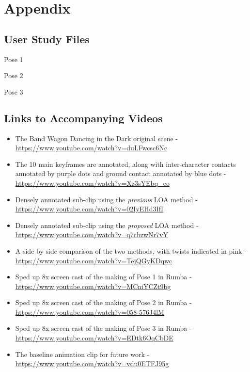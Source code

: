 \appendix \chapter{Appendix}\label{chap:appendix}
\section{User Study Files}
Pose 1

Pose 2

Pose 3

\section{Links to Accompanying Videos}

\begin{itemize}
\item The Band Wagon Dancing in the Dark original scene - \url{https://www.youtube.com/watch?v=duLFwcsc6Nc}

\item The 10 main keyframes are annotated, along with inter-character contacts annotated by purple dots and ground contact annotated by blue dots - \url{https://www.youtube.com/watch?v=Xz3sYEbq_eo}

\item Densely annotated sub-clip using the \textit{previous} LOA method - \url{https://www.youtube.com/watch?v=02IyEHd3IfI}

\item Densely annotated sub-clip using the \textit{proposed} LOA method - \url{https://www.youtube.com/watch?v=q7cbzwNr7vY}

\item A side by side comparison of the two methods, with twists indicated in pink - \url{https://www.youtube.com/watch?v=TejQGyKDqwc}

\item Sped up 8x screen cast of the making of Pose 1 in Rumba - \url{https://www.youtube.com/watch?v=MCniYCZt9bg}

\item Sped up 8x screen cast of the making of Pose 2 in Rumba - \url{https://www.youtube.com/watch?v=058-576J4lM}

\item Sped up 8x screen cast of the making of Pose 3 in Rumba - \url{https://www.youtube.com/watch?v=EDtk6OqCbDE}

\item The baseline animation clip for future work - \url{https://www.youtube.com/watch?v=vdu0ETFJ95g}


\end{itemize}